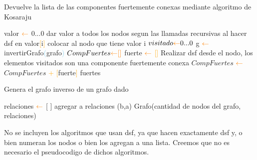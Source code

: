 \begin{algorithm}
\caption{Devuelve la lista de las componentes fuertemente conexas mediante algoritmo de Kosaraju}
\label{alg:algoritmo2}
\begin{algorithmic}[1]
\STATE valor $\textcolor{orange}{\leftarrow}$ {0...0}
\STATE dar valor a todos los nodos segun las llamadas recursivas al hacer dsf
\STATE en valor\textcolor{orange}{[}i\textcolor{orange}{]} colocar al nodo que tiene valor i
\STATE $visitado \textcolor{orange}{\leftarrow} {0...0}$
\STATE g $\textcolor{orange}{\leftarrow}$ invertirGrafo\textcolor{SkyBlue}{(}grafo\textcolor{SkyBlue}{)}
\STATE $CompFuertes \textcolor{orange}{\leftarrow} \textcolor{orange}{[}\textcolor{orange}{]}$
		\STATE fuerte $\textcolor{orange}{\leftarrow}$ \textcolor{orange}{[}\textcolor{orange}{]}
		\STATE Realizar dsf desde el nodo, los elementos visitados son una componente fuertemente conexa
		\STATE $CompFuertes$ $\textcolor{orange}{\leftarrow}$ $CompFuertes$ \textcolor{orange}{+} \textcolor{orange}{[}fuerte\textcolor{orange}{]}
\ENDFOR
\RETURN fuertes
\end{algorithmic}
\end{algorithm}

\begin{algorithm}
\caption{Genera el grafo inverso de un grafo dado}
\label{alg:algoritmo3}
\begin{algorithmic}
\STATE relaciones $\textcolor{orange}{\leftarrow}$ [ ]
		\STATE agregar a relaciones (b,a)
	\ENDFOR
\ENDFOR
\RETURN Grafo(cantidad de nodos del grafo, relaciones)	
\end{algorithmic}
\end{algorithm}

No se incluyen los algoritmos que usan dsf, ya que hacen exactamente dsf y, o bien numeran los nodos o bien los agregan a una lista. Creemos que no es necesario el pseudocodigo de dichos algoritmos.
			
